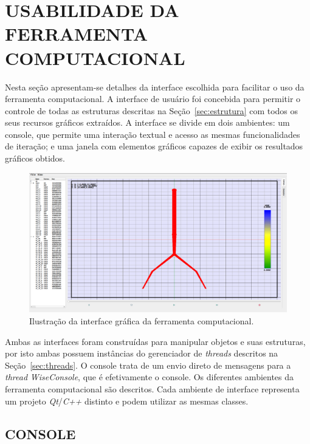 \pagebreak
\chapter{USABILIDADE DA FERRAMENTA COMPUTACIONAL}\label{sec:userinterface}

Nesta seção apresentam-se detalhes da interface escolhida para facilitar o uso da ferramenta computacional. A interface de usuário foi concebida para permitir o controle de todas as estruturas descritas na Seção~\ref{sec:estrutura} com todos os seus recursos gráficos extraídos. A interface se divide em dois ambientes: um console, que permite uma interação textual e acesso as mesmas funcionalidades de iteração; e uma janela com elementos gráficos capazes de exibir os resultados gráficos obtidos. 

\begin{figure}[!htbp]
	\centering
	\includegraphics[width=\linewidth]{Figures/IGU_002.png}
	\caption{Ilustração da interface gráfica da ferramenta computacional.}
	\label{fig10:UI}
\end{figure}

Ambas as interfaces foram construídas para manipular objetos e suas estruturas, por isto ambas possuem instâncias do gerenciador de \textit{threads} descritos na Seção~\ref{sec:threads}. O console trata de um envio direto de mensagens para a \textit{thread} \textit{WiseConsole}, que é efetivamente o console. Os diferentes ambientes da ferramenta computacional são descritos. Cada ambiente de interface representa um projeto \textit{Qt}/\textit{C++} distinto e podem utilizar as mesmas classes.

\section{CONSOLE}\label{sec:console}

